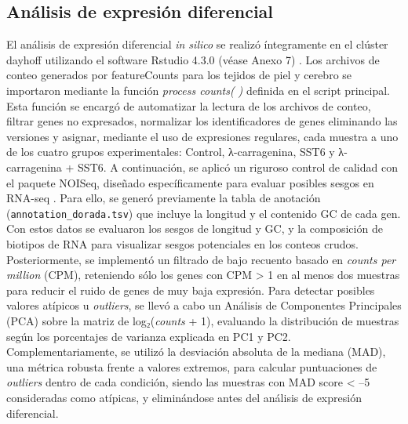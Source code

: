 \documentclass[10pt,a4paper]{article}
\begin{document}
\subsection{Análisis de expresión diferencial}  
El análisis de expresión diferencial \textit{in silico} se realizó íntegramente en el clúster dayhoff utilizando el software Rstudio 4.3.0 (véase Anexo 7) \parencite{RCore2024}. Los archivos de conteo generados por featureCounts para los tejidos de piel y cerebro se importaron mediante la función \textit{process counts( )} definida en el script principal. Esta función se encargó de automatizar la lectura de los archivos de conteo, filtrar genes no expresados, normalizar los identificadores de genes eliminando las versiones y asignar, mediante el uso de expresiones regulares, cada muestra a uno de los cuatro grupos experimentales: Control, λ-carragenina, SST6 y λ-carragenina + SST6. A continuación, se aplicó un riguroso control de calidad con el paquete NOISeq, diseñado específicamente para evaluar posibles sesgos en RNA-seq \parencite{Tarazona2012}. Para ello, se generó previamente la tabla de anotación (\texttt{annotation\_dorada.tsv}) que incluye la longitud y el contenido GC de cada gen. Con estos datos se evaluaron los sesgos de longitud y GC, y la composición de biotipos de RNA para visualizar sesgos potenciales en los conteos crudos. Posteriormente, se implementó un filtrado de bajo recuento basado en \textit{counts per million} (CPM), reteniendo sólo los genes con CPM > 1 en al menos dos muestras para reducir el ruido de genes de muy baja expresión. Para detectar posibles valores atípicos u \textit{outliers}, se llevó a cabo un Análisis de Componentes Principales (PCA) sobre la matriz de log₂(\textit{counts} + 1), evaluando la distribución de muestras según los porcentajes de varianza explicada en PC1 y PC2. Complementariamente, se utilizó la desviación absoluta de la mediana (MAD), una métrica robusta frente a valores extremos, para calcular puntuaciones de \textit{outliers} dentro de cada condición, siendo las muestras con MAD score < –5 consideradas como atípicas, y eliminándose antes del análisis de expresión diferencial.
\end{document}
